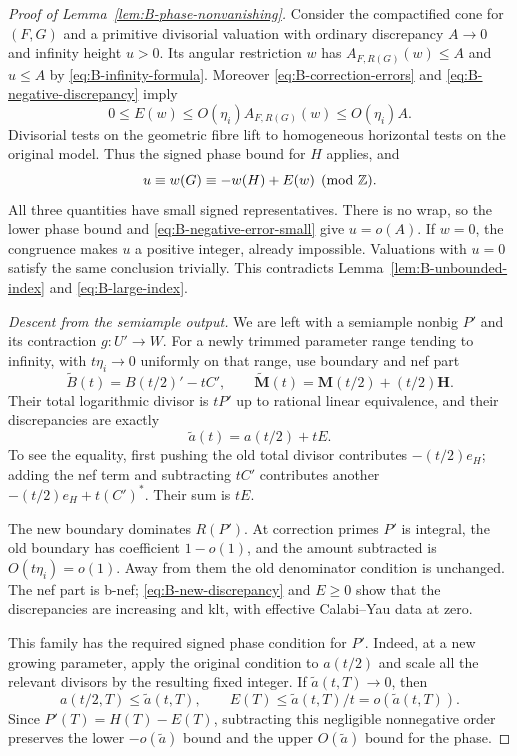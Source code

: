 \begin{proof}[Proof of Lemma~\ref{lem:B-phase-nonvanishing}]
Consider the compactified cone for $(F,G)$ and a primitive
divisorial valuation with ordinary discrepancy $A\to0$ and
infinity height $u>0$.  Its angular restriction $w$ has
$A_{F,R(G)}(w)\le A$ and $u\le A$ by
\eqref{eq:B-infinity-formula}.  Moreover
\eqref{eq:B-correction-errors} and
\eqref{eq:B-negative-discrepancy} imply
\begin{equation}\label{eq:B-negative-error-small}
 0\le E(w)\le O(\eta_i)A_{F,R(G)}(w)\le O(\eta_i)A.
\end{equation}
Divisorial tests on the geometric fibre lift to homogeneous
horizontal tests on the original model.  Thus the signed
phase bound for $H$ applies, and
\[
 u\equiv w(G)\equiv-w(H)+E(w)\pmod{\mathbb Z}.
\]
All three quantities have small signed representatives.
There is no wrap, so the lower phase bound and
\eqref{eq:B-negative-error-small} give $u=o(A)$.
If $w=0$, the congruence makes $u$ a positive integer,
already impossible.  Valuations with $u=0$ satisfy the
same conclusion trivially.  This contradicts
Lemma~\ref{lem:B-unbounded-index} and
\eqref{eq:B-large-index}.

\medskip
\noindent\emph{Descent from the semiample output.}
We are left with a semiample nonbig $P'$ and its contraction
$g:U'\to W$.  For a newly trimmed parameter range tending
to infinity, with $t\eta_i\to0$ uniformly on that range,
use boundary and nef part
\begin{equation}\label{eq:B-new-family}
 \widetilde B(t)=B(t/2)'-tC',
 \qquad
 \widetilde{\mathbf M}(t)=\mathbf M(t/2)+(t/2)\mathbf H.
\end{equation}
Their total logarithmic divisor is $tP'$ up to rational
linear equivalence, and their discrepancies are exactly
\begin{equation}\label{eq:B-new-discrepancy}
 \widetilde a(t)=a(t/2)+tE.
\end{equation}
To see the equality, first pushing the old total divisor
contributes $-(t/2)e_H$; adding the nef term and subtracting
$tC'$ contributes another $-(t/2)e_H+t(C')^*$.
Their sum is $tE$.

The new boundary dominates $R(P')$.  At correction primes
$P'$ is integral, the old boundary has coefficient
$1-o(1)$, and the amount subtracted is $O(t\eta_i)=o(1)$.
Away from them the old denominator condition is unchanged.
The nef part is b-nef; \eqref{eq:B-new-discrepancy} and
$E\ge0$ show that the discrepancies are increasing and
klt, with effective Calabi--Yau data at zero.

This family has the required signed phase condition for
$P'$.  Indeed, at a new growing parameter, apply the
original condition to $a(t/2)$ and scale all the relevant
divisors by the resulting fixed integer.  If
$\widetilde a(t,T)\to0$, then
\[
 a(t/2,T)\le\widetilde a(t,T),
 \qquad E(T)\le\widetilde a(t,T)/t
      =o(\widetilde a(t,T)).
\]
Since $P'(T)=H(T)-E(T)$, subtracting this negligible
nonnegative order preserves the lower $-o(\widetilde a)$
bound and the upper $O(\widetilde a)$ bound for the phase.


\end{proof}
